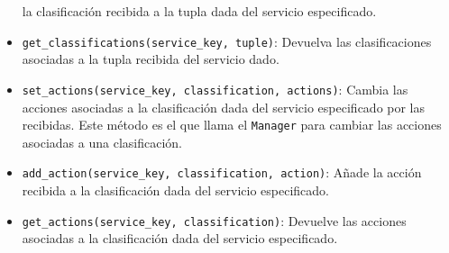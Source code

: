 \begin{itemize}
  la clasificación recibida a la tupla dada del servicio especificado.
 \item \texttt{get\_classifications(service\_key, tuple)}: Devuelva las 
  clasificaciones asociadas a la tupla recibida del servicio dado.
 \item \texttt{set\_actions(service\_key, classification, actions)}: Cambia las 
  acciones asociadas a la clasificación dada del servicio especificado por las 
  recibidas. Este método es el que llama el \texttt{Manager} para cambiar las 
  acciones asociadas a una clasificación.
 \item \texttt{add\_action(service\_key, classification, action)}: Añade la
  acción recibida a la clasificación dada del servicio especificado.
 \item \texttt{get\_actions(service\_key, classification)}: Devuelve las
  acciones asociadas a la clasificación dada del servicio especificado. 
\end{itemize}